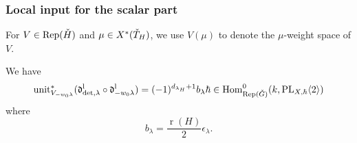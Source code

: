 \documentclass[reqno]{amsart}
\numberwithin{equation}{section}
\numberwithin{equation}{section}
\begin{document}
\subsubsection{Local input for the scalar part}
For $V\in \operatorname{Rep}(\check{H})$ and $\mu\in X^*(\check{T}_H)$, we use $V(\mu)$ to denote the $\mu$-weight space of $V$.

\begin{prop}\label{prop:scalarpartloc}
    We have \[\mathrm{unit}_{V_{-w_0\lambda}}^*(\mathfrak{d}_{\det,\lambda}^{\mathrm{l}}\circ \mathfrak{d}_{-w_0\lambda}^{\mathrm{l}})=(-1)^{d_{\lambda_H} +1}b_{\lambda}\hbar \in \operatorname{Hom}^0_{\operatorname{Rep}(\check{G})}(k, \mathrm{PL}_{X,\hbar}\langle 2\rangle)\] where \begin{equation}\label{eq:bformula}
    b_{\lambda}=\frac{\operatorname{r}(H)}{2}\epsilon_{\lambda}.
\end{equation}
\end{prop}
\end{document}

